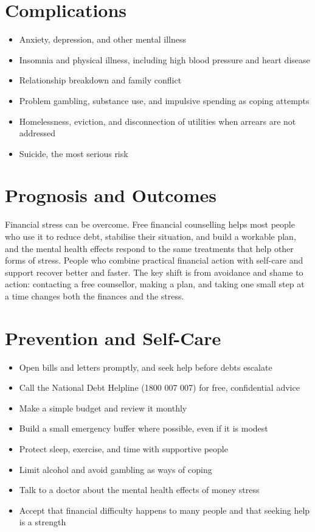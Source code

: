 \section*{Complications}
\begin{itemize}
    \item Anxiety, depression, and other mental illness
    \item Insomnia and physical illness, including high blood pressure and heart disease
    \item Relationship breakdown and family conflict
    \item Problem gambling, substance use, and impulsive spending as coping attempts
    \item Homelessness, eviction, and disconnection of utilities when arrears are not addressed
    \item Suicide, the most serious risk
\end{itemize}

\section*{Prognosis and Outcomes}
Financial stress can be overcome. Free financial counselling helps most people who use it to reduce debt, stabilise their situation, and build a workable plan, and the mental health effects respond to the same treatments that help other forms of stress. People who combine practical financial action with self-care and support recover better and faster. The key shift is from avoidance and shame to action: contacting a free counsellor, making a plan, and taking one small step at a time changes both the finances and the stress.

\section*{Prevention and Self-Care}
\begin{itemize}
    \item Open bills and letters promptly, and seek help before debts escalate
    \item Call the National Debt Helpline (1800 007 007) for free, confidential advice
    \item Make a simple budget and review it monthly
    \item Build a small emergency buffer where possible, even if it is modest
    \item Protect sleep, exercise, and time with supportive people
    \item Limit alcohol and avoid gambling as ways of coping
    \item Talk to a doctor about the mental health effects of money stress
    \item Accept that financial difficulty happens to many people and that seeking help is a strength
\end{itemize}

